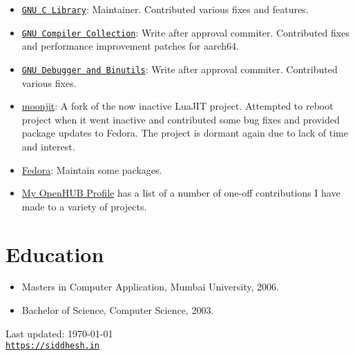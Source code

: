\documentclass[letterpaper]{article}
\def\footerlink{https://siddhesh.in}
\begin{document}
\begin{itemize}
	\item \href{https://www.gnu.org/s/libc}{\tt GNU C Library}: Maintainer.
		Contributed various fixes and features.
	\item \href{https://www.gnu.org/s/gcc}{\tt GNU Compiler Collection}:
		Write after approval commiter.  Contributed fixes and
		performance improvement patches for aarch64.
	\item \href{https://www.gnu.org/s/binutils}{\tt GNU Debugger and Binutils}:
		Write after approval commiter. Contributed various fixes.
	\item \href{https://github.com/moonjit/moonjit}{moonjit}: A fork of the
		now inactive LuaJIT project.  Attempted to reboot project when
		it went inactive and contributed some bug fixes and provided
		package updates to Fedora.  The project is dormant again due to
		lack of time and interest.
	\item \href{https://fedora.org}{Fedora}: Maintain some packages.
	\item \href{https://www.openhub.net/accounts/siddhesh}{My OpenHUB
		Profile} has a list of a number of one-off contributions I have
		made to a variety of projects.
\end{itemize}

\section*{Education}

\begin{itemize}
  \item Masters in Computer Application, Mumbai University, 2006.
  \item Bachelor of Science, Computer Science, 2003.
\end{itemize}
\bigskip

\begin{center}
  \begin{footnotesize}
    Last updated: \today \\
    \href{\footerlink}{\texttt{\footerlink}}
  \end{footnotesize}
\end{center}
\end{document}
